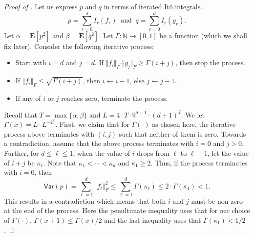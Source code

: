 \documentclass{toc}
\begin{document}
\begin{proof}[Proof of ]
    Let us express $p$ and $q$ in terms of iterated It\^{o} integrals. 
\[
p = \sum_{r=0}^{d} I_r(f_r) \ \textrm{ and } \ q = \sum_{r=0}^{d} I_r(g_r).
\]
Let $\alpha = \mathbf{E}[p^2]$ and $\beta= \mathbf{E}[q^2]$. 
Let $\Gamma : \mathbb{N} \rightarrow [0,1]$ be a function (which we shall fix later). Consider the following iterative process:
\begin{itemize}
\item Start with $i=d$ and $j=d$. If $\Vert f_i \Vert_F \cdot \Vert g_j \Vert_F \ge \Gamma(i+j)$, then stop the process. 
\item If $\Vert f_i \Vert_F \le \sqrt{\Gamma(i+j)}$, then $i \leftarrow i-1$, else $j \leftarrow  j-1$. 
\item If any of $i$ or $j$ reaches zero, terminate the process. 
\end{itemize}
Recall that  $T = \max \{\alpha, \beta\} $ and $L = 4 \cdot T \cdot 9^{d+1} \cdot (d+1)^2$. We let $\Gamma (x) = L \cdot L^{-2^{x}}$. First, we claim that for $\Gamma(\cdot)$ as chosen here, the iterative process above terminates with $(i,j)$ such that neither of them is zero. Towards a contradiction, assume that the above process terminates with $i=0$ and $j>0$. Further, for $d \le \ell \le 1$, when the value of $i$ drops from $\ell$ to $\ell-1$, let the value of $i+j$ be $\kappa_\ell$. Note that $\kappa_1 < \cdots < \kappa_d$ and $\kappa_1 \ge 2$.  Thus, if the process terminates with $i=0$, 
then 
\[
\mathsf{Var}(p)= \sum_{\ell=1}^d \Vert f_\ell \Vert_F^2  \le \sum_{\ell=1}^d  \Gamma(\kappa_\ell) \le 2 \cdot \Gamma(\kappa_1)  <1.
\]
This results in a contradiction which means that both $i$ and $j$ must be non-zero at the end of the process.  Here the penultimate inequality uses that for our choice of $\Gamma(\cdot)$, $\Gamma(x+1) \le \Gamma(x)/2$ and the last inequality uses that $\Gamma(\kappa_1) <1/2$. 


\end{proof}
\end{document}
